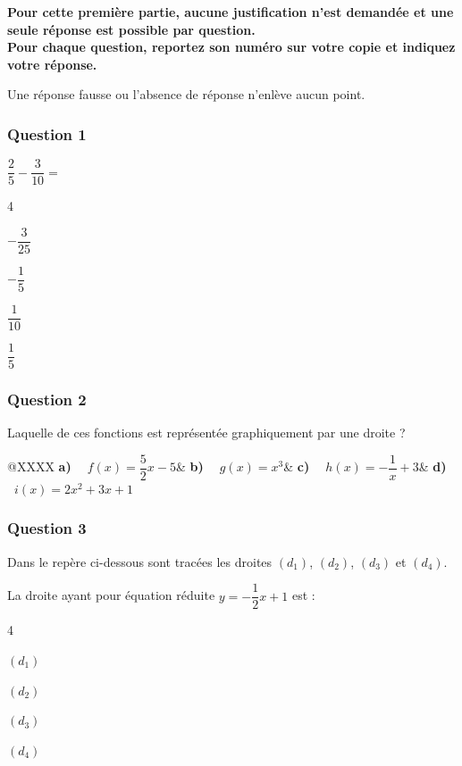 	\textbf{Pour cette première partie, aucune justification n'est demandée et une seule réponse est possible par question.\\
	Pour chaque question, reportez son numéro sur votre copie et indiquez votre réponse.}

	Une réponse fausse ou l'absence de réponse n'enlève aucun point.

\subsubsection*{Question 1}
\mbox{$\dfrac25-\dfrac{3}{10}=$}
		\begin{enumerate}[label=\textbf{\alph*)}]
\begin{multicols}{4}
			\item \mbox{$-\dfrac{3}{25}$}
			\item \mbox{$-\dfrac15$}
			\item \mbox{$\dfrac{1}{10}$}
			\item \mbox{$\dfrac15$}
				\end{multicols}
		\end{enumerate}

		\subsubsection*{Question 2}

Laquelle de ces fonctions est représentée graphiquement par une droite ?

		\begin{tblr}{@{\hspace*{5mm}}XXXX}
			\textbf{a) ~} \mbox{$f(x)=\dfrac52 x-5$}&
			\textbf{b) ~} \mbox{$g(x)=x^3$}&
			\textbf{c) ~} \mbox{$h(x)=-\dfrac1 x +3$}&
			\textbf{d) ~}\mbox{$i(x)=2x^2+3x+1$}
		\end{tblr}

\subsubsection*{Question 3}
	Dans le repère ci-dessous sont tracées les droites $(d_1)$, $(d_2)$, $(d_3)$ et $(d_4)$.

	La droite ayant pour équation réduite \quad\mbox{$y=-\dfrac12 x +1$} \quad est :
	\begin{enumerate}[label=\textbf{\alph*)}]
		\begin{multicols}{4}
			\item $(d_1)$
			\item $(d_2)$
			\item $(d_3)$
			\item $(d_4)$
		\end{multicols}
	\end{enumerate}

